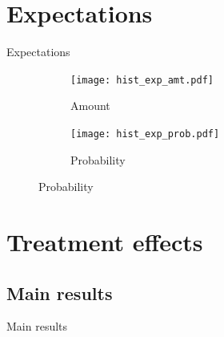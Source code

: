 \documentclass[8pt]{beamer}
\begin{document}
\section{Expectations}

\begin{frame}{Expectations}
    

\begin{figure}[H]
    \caption{Histograms of expectations}
    \label{hist_exp}
    \begin{center}
        \begin{subfigure}{0.45\textwidth}
            \caption{Amount}
            \centering
            \texttt{[image: hist\_exp\_amt.pdf]}
        \end{subfigure}
        \begin{subfigure}{0.45\textwidth}
            \caption{Probability}
                \centering
                \texttt{[image: hist\_exp\_prob.pdf]}
        \end{subfigure}
        \end{center}
        \end{figure}
\end{frame}




\section{Treatment effects}

\subsection{Main results}
\begin{frame}{Main results}

 \begin{table}[H] 
 \begin{subtable}{1.\textwidth}
 \begin{center}
 \tiny{}
 \end{center}
 \end{subtable}
 \end{table}  
 
\end{frame}
\end{document}
